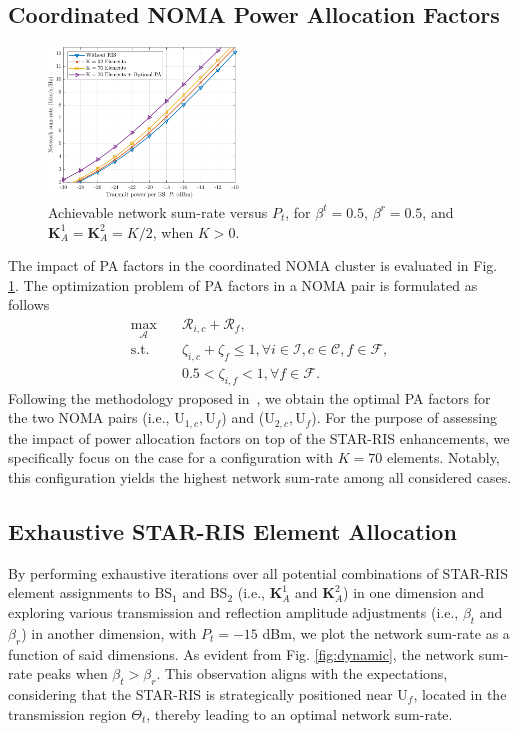 \documentclass[conference]{IEEEtran}
\begin{document}
\subsection{Coordinated NOMA Power Allocation Factors}
\begin{figure}[t!]
    \centering
    \includegraphics[width=0.45\textwidth]{figs/sumrate.pdf}
    \caption{Achievable network sum-rate versus $P_{t}$, for $\beta^t=0.5$, $\beta^r=0.5$, and $\textbf{K}_A^1=\textbf{K}_A^2=K/2$, when $K > 0$.}
    \label{fig:sumrate}
\end{figure}
The impact of PA factors in the coordinated NOMA cluster is evaluated in Fig. \ref{fig:sumrate}. The optimization problem of PA factors in a NOMA pair is formulated as follows
\begin{align}
    \max_{\mathbf{\mathcal{A}}} \quad & \mathcal{R}_{i,c} + \mathcal{R}_{f}, \label{eq:opt2}                                                   \\
    \textrm{s.t.}
    \quad                             & \zeta_{i,c} + \zeta_f\leq1, \forall i \in \mathcal{I}, c \in \mathcal{C}, f \in \mathcal{F}, \nonumber \\
    \quad                             & 0.5 < \zeta_{i,f} < 1, \forall f \in \mathcal{F}. \nonumber
\end{align}
Following the methodology proposed in~\cite{fang2016energy}, we obtain the optimal PA factors for the two NOMA pairs (i.e., ${\text{U}_{1,c}, \text{U}_f}$) and (${\text{U}_{2,c}, \text{U}_f}$). For the purpose of assessing the impact of power allocation factors on top of the STAR-RIS enhancements, we specifically focus on the case for a configuration with $K=70$ elements. Notably, this configuration yields the highest network sum-rate among all considered cases.

\subsection{Exhaustive STAR-RIS Element Allocation}
By performing exhaustive iterations over all potential combinations of STAR-RIS element assignments to BS$_1$ and BS$_2$ (i.e., $\textbf{K}_A^1$ and $\textbf{K}_A^2$) in one dimension and exploring various transmission and reflection amplitude adjustments (i.e., $\beta_t$ and $\beta_r$) in another dimension, with $P_t=-15$ dBm, we plot the network sum-rate as a function of said dimensions. As evident from Fig. \ref{fig:dynamic}, the network sum-rate peaks when $\beta_t>\beta_r$. This observation aligns with the expectations, considering that the STAR-RIS is strategically positioned near U$_f$, located in the transmission region $\Theta_t$, thereby leading to an optimal network sum-rate.
\end{document}
